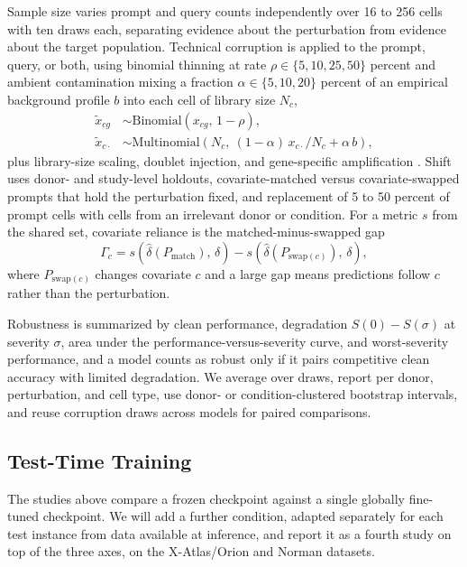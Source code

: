 \documentclass[times, twoside, watermark]{zHenriquesLab-StyleBioRxiv}
\begin{document}
Sample size varies prompt and query counts independently over 16 to 256 cells with ten draws each, separating evidence about the perturbation from evidence about the target population. Technical corruption is applied to the prompt, query, or both, using binomial thinning at rate $\rho \in \{5,10,25,50\}$ percent and ambient contamination mixing a fraction $\alpha \in \{5,10,20\}$ percent of an empirical background profile $b$ into each cell of library size $N_c$,
\begin{equation}
\begin{aligned}
\tilde{x}_{cg} &\sim \mathrm{Binomial}\!\left(x_{cg},\, 1-\rho\right),\\
\tilde{x}_{c\cdot} &\sim \mathrm{Multinomial}\!\left(N_c,\ (1-\alpha)\,x_{c\cdot}/N_c + \alpha\, b\right),
\end{aligned}
\end{equation}
plus library-size scaling, doublet injection, and gene-specific amplification \cite{sallam2026nuisance,perciballi2026microbiome}. Shift uses donor- and study-level holdouts, covariate-matched versus covariate-swapped prompts that hold the perturbation fixed, and replacement of 5 to 50 percent of prompt cells with cells from an irrelevant donor or condition. For a metric $s$ from the shared set, covariate reliance is the matched-minus-swapped gap
\begin{equation}
\Gamma_c = s\!\left(\hat{\delta}(P_{\mathrm{match}}),\, \delta\right) - s\!\left(\hat{\delta}(P_{\mathrm{swap}(c)}),\, \delta\right),
\end{equation}
where $P_{\mathrm{swap}(c)}$ changes covariate $c$ and a large gap means predictions follow $c$ rather than the perturbation.

Robustness is summarized by clean performance, degradation $S(0)-S(\sigma)$ at severity $\sigma$, area under the performance-versus-severity curve, and worst-severity performance, and a model counts as robust only if it pairs competitive clean accuracy with limited degradation. We average over draws, report per donor, perturbation, and cell type, use donor- or condition-clustered bootstrap intervals, and reuse corruption draws across models for paired comparisons.

\subsection*{Test-Time Training}

The studies above compare a frozen checkpoint against a single globally fine-tuned checkpoint. We will add a further condition, adapted separately for each test instance from data available at inference, and report it as a fourth study on top of the three axes, on the X-Atlas/Orion and Norman datasets.
 
\end{document}
